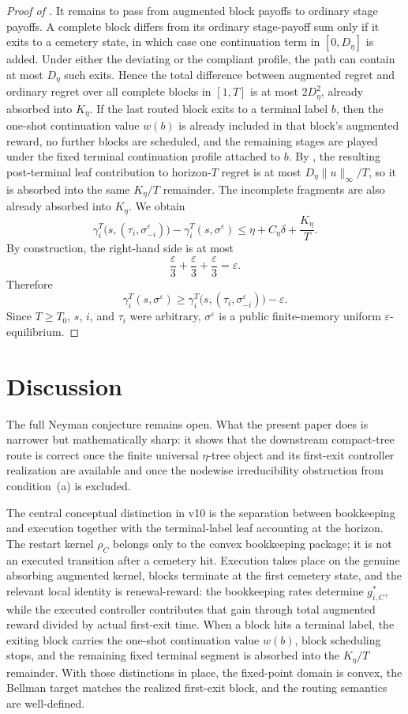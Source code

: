 \documentclass[12pt]{article}
\theoremstyle{definition}
\newcommand{\eps}{\varepsilon}
\newcommand{\1}{\mathbf{1}}
\begin{document}
\begin{proof}[Proof of ]
It remains to pass from augmented block payoffs to ordinary stage payoffs. A
complete block differs from its ordinary stage-payoff sum only if it exits to a
cemetery state, in which case one continuation term in $[0,D_\eta]$ is added.
Under either the deviating or the compliant profile, the path can contain at
most $D_\eta$ such exits. Hence the total difference between augmented regret
and ordinary regret over all complete blocks in $[1,T]$ is at most
$2D_\eta^2$, already absorbed into $K_\eta$. If the last routed block exits to a
terminal label $b$, then the one-shot continuation value $w(b)$ is already
included in that block's augmented reward, no further blocks are scheduled, and
the remaining stages are played under the fixed terminal continuation profile
attached to $b$. By , the resulting
post-terminal leaf contribution to horizon-$T$ regret is at most
$D_\eta\|u\|_\infty/T$, so it is absorbed into the same $K_\eta/T$ remainder.
The incomplete fragments are also already absorbed into $K_\eta$. We obtain
\[
\gamma_i^T\bigl(s,(\tau_i,\sigma^\eps_{-i})\bigr)
-
\gamma_i^T(s,\sigma^\eps)
\le
\eta + C_\eta\delta + \frac{K_\eta}{T}.
\]
By construction, the right-hand side is at most
\[
\frac{\eps}{3}+\frac{\eps}{3}+\frac{\eps}{3}=\eps.
\]
Therefore
\[
\gamma_i^T(s,\sigma^\eps)
\ge
\gamma_i^T\bigl(s,(\tau_i,\sigma^\eps_{-i})\bigr)-\eps.
\]
Since $T\ge T_0$, $s$, $i$, and $\tau_i$ were arbitrary, $\sigma^\eps$ is a
public finite-memory uniform $\eps$-equilibrium.
\end{proof}


\section{Discussion}

The full Neyman conjecture remains open. What the present paper does is narrower
but mathematically sharp: it shows that the downstream compact-tree route is
correct once the finite universal $\eta$-tree object and its first-exit controller
realization are available and once the nodewise irreducibility obstruction from
condition~\textnormal{(a)} is excluded.

The central conceptual distinction in v10 is the separation between bookkeeping
and execution together with the terminal-label leaf accounting at the horizon.
The restart kernel $\rho_C$ belongs only to the convex bookkeeping package; it
is not an executed transition after a cemetery hit. Execution takes place on the
genuine absorbing augmented kernel, blocks terminate at the first cemetery
state, and the relevant local identity is renewal-reward: the bookkeeping rates
determine $g_{i,C}^*$, while the executed controller contributes that gain
through total augmented reward divided by actual first-exit time. When a block
hits a terminal label, the exiting block carries the one-shot continuation value
$w(b)$, block scheduling stops, and the remaining fixed terminal segment is
absorbed into the $K_\eta/T$ remainder. With those distinctions in place, the
fixed-point domain is convex, the Bellman target matches the realized first-exit
block, and the routing semantics are well-defined.
\end{document}

